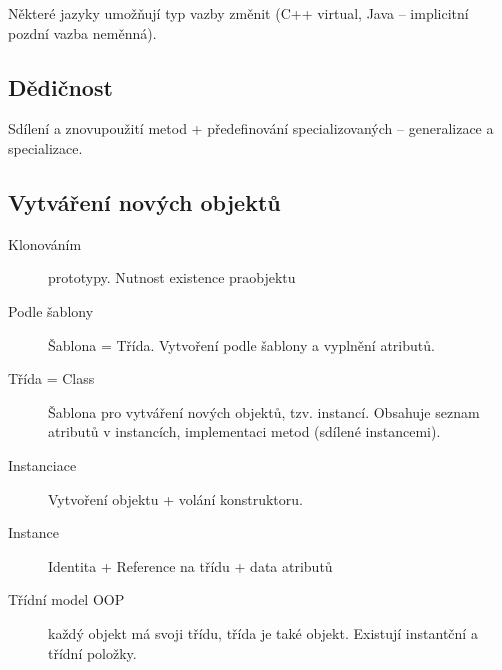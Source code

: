 \documentclass[a4wide]{report}
\begin{document}
Některé jazyky umožňují typ vazby změnit (C++ virtual, Java -- implicitní pozdní vazba neměnná).

\subsection{Dědičnost}

Sdílení a znovupoužití metod + předefinování specializovaných -- generalizace a specializace.

\subsection{Vytváření nových objektů}
\begin{description}
	\item[Klonováním] prototypy. Nutnost existence praobjektu
	\item[Podle šablony] Šablona = Třída. Vytvoření podle šablony a vyplnění atributů.
\end{description}

\begin{description}
	\item[Třída = Class] Šablona pro vytváření nových objektů, tzv. instancí. Obsahuje seznam atributů v instancích, implementaci metod (sdílené instancemi).
	\item[Instanciace] Vytvoření objektu + volání konstruktoru.
	\item[Instance] Identita + Reference na třídu + data atributů
	\item[Třídní model OOP] každý objekt má svoji třídu, třída je také objekt. Existují instantční a třídní položky.
\end{description}
\end{document}
